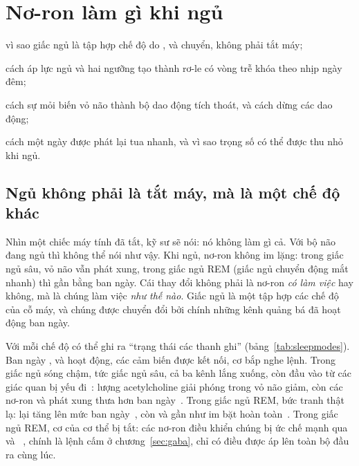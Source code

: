 \chapter{Nơ-ron làm gì khi ngủ}
\label{sec:sleep}
\begin{chaptergoals}
\item vì sao giấc ngủ là tập hợp chế độ do ,  và  chuyển, không phải tắt máy;
\item cách áp lực ngủ và hai ngưỡng tạo thành rơ-le có vòng trễ khóa theo nhịp ngày đêm;
\item cách sự mỏi biến vỏ não thành bộ dao động tích thoát, và cách  dừng các dao động;
\item cách một ngày được phát lại tua nhanh, và vì sao trọng số có thể được thu nhỏ khi ngủ.
\end{chaptergoals}

\section{Ngủ không phải là tắt máy, mà là một chế độ khác}

Nhìn một chiếc máy tính đã tắt, kỹ sư sẽ nói: nó không làm gì cả. Với bộ não đang ngủ thì không thể nói như vậy. Khi ngủ, nơ-ron không im lặng: trong giấc ngủ sâu, vỏ não vẫn phát xung, trong giấc ngủ REM (giấc ngủ chuyển động mắt nhanh) thì gần bằng ban ngày. Cái thay đổi không phải là nơ-ron \emph{có làm việc} hay không, mà là chúng làm việc \emph{như thế nào}. Giấc ngủ là một tập hợp các chế độ của cỗ máy, và chúng được chuyển đổi bởi chính những kênh quảng bá đã hoạt động ban ngày.

Với mỗi chế độ có thể ghi ra ``trạng thái các thanh ghi'' (bảng~\ref{tab:sleepmodes}). Ban ngày ,  và  hoạt động, các cảm biến được kết nối, cơ bắp nghe lệnh. Trong giấc ngủ sóng chậm, tức giấc ngủ sâu, cả ba kênh lắng xuống, còn đầu vào từ các giác quan bị yếu đi~\cite{Hasselmo1999}: lượng acetylcholine giải phóng trong vỏ não giảm, còn các nơ-ron  và  phát xung thưa hơn ban ngày~\cite{Marrosu1995,AstonJonesBloom1981,McGintyHarper1976}. Trong giấc ngủ REM, bức tranh thật lạ:  lại tăng lên mức ban ngày~\cite{Marrosu1995}, còn  và  gần như im bặt hoàn toàn~\cite{AstonJonesBloom1981,McGintyHarper1976,JacobsAzmitia1992}. Trong giấc ngủ REM, cơ của cơ thể bị tắt: các nơ-ron  điều khiển chúng bị ức chế mạnh qua  và ~\cite{BrooksPeever2012}, chính là lệnh cấm ở chương~\ref{sec:gaba}, chỉ có điều được áp lên toàn bộ đầu ra cùng lúc.

